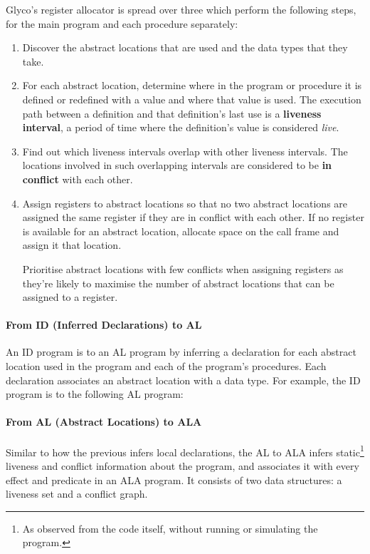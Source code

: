 \documentclass[main.tex]{subfiles}
\begin{document}
Glyco's register allocator is spread over three  which perform the following steps, for the main program and each procedure separately:
\begin{enumerate}
	\item Discover the abstract locations that are used and the data types that they take.
	\item For each abstract location, determine where in the program or procedure it is defined or redefined with a value and where that value is used. The execution path between a definition and that definition's last use is a \textbf{liveness interval}, a period of time where the definition's value is considered \emph{live}.
	\item Find out which liveness intervals overlap with other liveness intervals. The locations involved in such overlapping intervals are considered to be \textbf{in conflict} with each other.
	\item Assign registers to abstract locations so that no two abstract locations are assigned the same register if they are in conflict with each other. If no register is available for an abstract location, allocate space on the call frame and assign it that location.
	
	Prioritise abstract locations with few conflicts when assigning registers as they're likely to maximise the number of abstract locations that can be assigned to a register.
\end{enumerate}

\paragraph{From ID (Inferred Declarations) to AL} An ID program is \lowered{} to an AL program by inferring a declaration for each abstract location used in the program and each of the program's procedures. Each declaration associates an abstract location with a data type. For example, the ID program
is \lowered{} to the following AL program:

\paragraph{From AL (Abstract Locations) to ALA} Similar to how the previous  infers local declarations, the AL to ALA  infers static\footnote{As observed from the code itself, without running or simulating the program.} liveness and conflict information about the program, and associates it with every effect and predicate in an ALA program. It consists of two data structures: a liveness set and a conflict graph.
\end{document}
